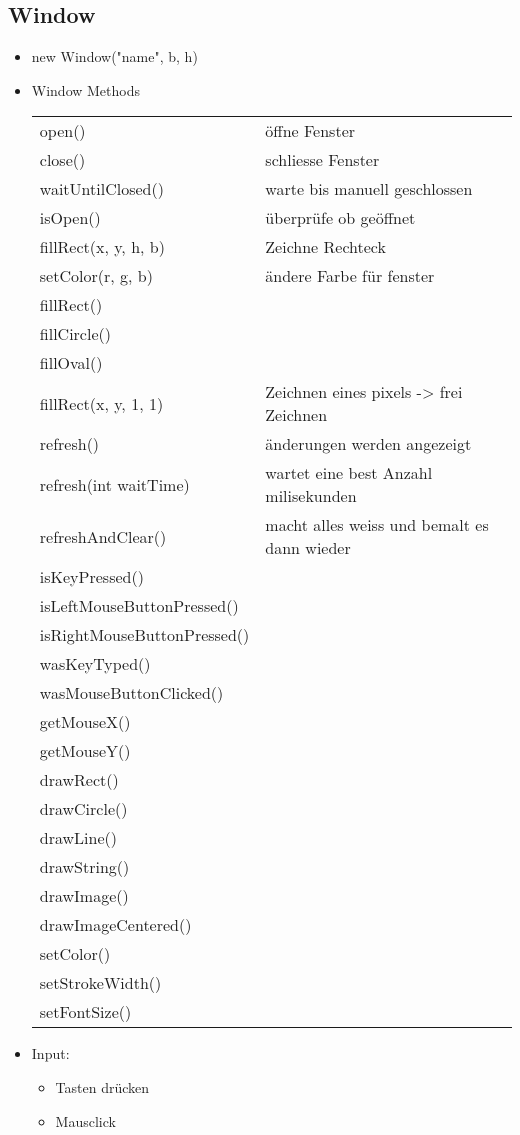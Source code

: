 \documentclass[11pt]{article}
\begin{document}
\subsection{Window}
\label{sec:org200aff4}
\begin{itemize}
\item new Window("name", b, h)\\

\item Window Methods\\
\begin{center}
\begin{tabular}{ll}
open() & öffne Fenster\\
close() & schliesse Fenster\\
waitUntilClosed() & warte bis manuell geschlossen\\
isOpen() & überprüfe ob geöffnet\\
fillRect(x, y, h, b) & Zeichne Rechteck\\
setColor(r, g, b) & ändere Farbe für fenster\\
fillRect() & \\
fillCircle() & \\
fillOval() & \\
fillRect(x, y, 1, 1) & Zeichnen eines pixels -> frei Zeichnen\\
refresh() & änderungen werden angezeigt\\
refresh(int waitTime) & wartet eine best Anzahl milisekunden\\
refreshAndClear() & macht alles weiss und bemalt es dann wieder\\
isKeyPressed() & \\
isLeftMouseButtonPressed() & \\
isRightMouseButtonPressed() & \\
wasKeyTyped() & \\
wasMouseButtonClicked() & \\
getMouseX() & \\
getMouseY() & \\
drawRect() & \\
drawCircle() & \\
drawLine() & \\
drawString() & \\
drawImage() & \\
drawImageCentered() & \\
setColor() & \\
setStrokeWidth() & \\
setFontSize() & \\
\end{tabular}
\end{center}

\item Input:\\
\begin{itemize}
\item Tasten drücken\\
\item Mausclick\\
\end{itemize}
\end{itemize}
\end{document}
